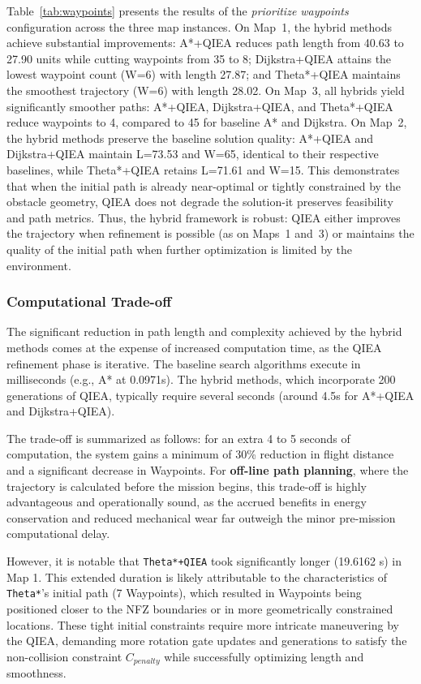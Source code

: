 Table~\ref{tab:waypoints} presents the results of the \emph{prioritize waypoints} configuration across the three map instances. On Map~1, the hybrid methods achieve substantial improvements: A*+QIEA reduces path length from 40.63 to 27.90 units while cutting waypoints from 35 to 8; Dijkstra+QIEA attains the lowest waypoint count (W=6) with length 27.87; and Theta*+QIEA maintains the smoothest trajectory (W=6) with length 28.02. On Map~3, all hybrids yield significantly smoother paths: A*+QIEA, Dijkstra+QIEA, and Theta*+QIEA reduce waypoints to 4, compared to 45 for baseline A* and Dijkstra. On Map~2, the hybrid methods preserve the baseline solution quality: A*+QIEA and Dijkstra+QIEA maintain L=73.53 and W=65, identical to their respective baselines, while Theta*+QIEA retains L=71.61 and W=15. This demonstrates that when the initial path is already near-optimal or tightly constrained by the obstacle geometry, QIEA does not degrade the solution-it preserves feasibility and path metrics. Thus, the hybrid framework is robust: QIEA either improves the trajectory when refinement is possible (as on Maps~1 and~3) or maintains the quality of the initial path when further optimization is limited by the environment.



\subsubsection{Computational Trade-off}

The significant reduction in path length and complexity achieved by the hybrid methods comes at the expense of increased computation time, as the QIEA refinement phase is iterative. The baseline search algorithms execute in milliseconds (e.g., A* at 0.0971s). The hybrid methods, which incorporate 200 generations of QIEA, typically require several seconds (around 4.5s for A*+QIEA and Dijkstra+QIEA).

The trade-off is summarized as follows: for an extra 4 to 5 seconds of computation, the system gains a minimum of 30\% reduction in flight distance and a significant decrease in Waypoints. For \textbf{off-line path planning}, where the trajectory is calculated before the mission begins, this trade-off is highly advantageous and operationally sound, as the accrued benefits in energy conservation and reduced mechanical wear far outweigh the minor pre-mission computational delay.

However, it is notable that \texttt{Theta*+QIEA} took significantly longer (19.6162 s) in Map 1. This extended duration is likely attributable to the characteristics of \texttt{Theta*}'s initial path (7 Waypoints), which resulted in Waypoints being positioned closer to the NFZ boundaries or in more geometrically constrained locations. These tight initial constraints require more intricate maneuvering by the QIEA, demanding more rotation gate updates and generations to satisfy the non-collision constraint $C_{penalty}$ while successfully optimizing length and smoothness.
    
